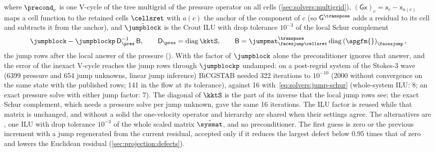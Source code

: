 where $\precond_{\mathrm{c}}$ is one V-cycle of the tree multigrid of the
pressure operator on all cells (\cref{sec:solvers:multigrid}),
$(\mathsf{G}\mathsf{x})_c=\mathsf{x}_c-\mathsf{x}_{a(c)}$ maps a cell function
to the retained cells $\cellsret$ with $a(c)$ the anchor of the component of
$c$ (so $\mathsf{G}^{\transpose}$ adds a residual to its cell and subtracts it
from the anchor), and $\tilde{\jumpblock}$ is the Crout ILU with drop
tolerance $10^{-3}$ of the local Schur complement
\begin{equation}\label{eq:solvers:jump-schur}
  \jumpblock-\jumpblockp\,\mathsf{D}_{\pres}^{-1}\,\mathsf{B},\qquad
  \mathsf{D}_{\pres}=\operatorname{diag}\kktS,\qquad
  \mathsf{B}=\jumpmat_{\facesjump\cellsret}^{\transpose}\diag{\apgfm{}}_{\facesjump},
\end{equation}
the jump rows after the local answer of the pressure (). With the
factor of $\jumpblock$ alone the preconditioner ignores that answer, and the
error of the inexact V-cycle reaches the jump rows through $\jumpblockp$
undamped: on a post-regrid system of the Stokes-3 wave (6399 pressure and
654 jump unknowns, linear jump inference) BiCGSTAB needed 322 iterations to
$10^{-10}$ (2000 without convergence on the same state with the published
rows; 141 in the flow at its tolerance), against 16 with~\cref{eq:solvers:jump-schur}
(whole-system ILU: 8; an exact pressure solve with either jump factor: 7).
The diagonal of $\kktS$ is the part of its inverse that the local jump rows
see; the exact Schur complement, which needs a pressure solve per jump
unknown, gave the same 16 iterations. The ILU factor is reused
while that matrix is unchanged, and without a solid the one-velocity
operator and hierarchy are shared when their settings agree. The alternatives
are , one ILU with drop tolerance $10^{-3}$ of the whole scaled
matrix $\hat{\sysmat}$, and no preconditioner. The first guess is zero or the
previous increment with a jump regenerated from the current residual,
accepted only if it reduces the largest defect below $0.95$ times that of
zero and lowers the Euclidean residual (\cref{sec:projection:defects}).

